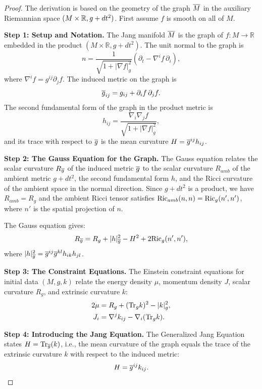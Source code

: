 \begin{proof}
The derivation is based on the geometry of the graph $\overline{M}$ in the auxiliary Riemannian space $(M \times \mathbb{R}, g+dt^2)$.
First assume $f$ is smooth on all of $M$.

\textbf{Step 1: Setup and Notation.}
The Jang manifold $\overline{M}$ is the graph of $f: M \to \mathbb{R}$ embedded in the product $(M \times \mathbb{R}, g + dt^2)$. The unit normal to the graph is
\[
    n = \frac{1}{\sqrt{1+|\nabla f|^2_g}} \left( \partial_t - \nabla^i f \, \partial_i \right),
\]
where $\nabla^i f = g^{ij} \partial_j f$. The induced metric on the graph is
\[
    \overline{g}_{ij} = g_{ij} + \partial_i f \, \partial_j f.
\]
The second fundamental form of the graph in the product metric is
\[
    h_{ij} = \frac{\nabla_i \nabla_j f}{\sqrt{1+|\nabla f|^2_g}},
\]
and its trace with respect to $\overline{g}$ is the mean curvature $H = \overline{g}^{ij} h_{ij}$.

\textbf{Step 2: The Gauss Equation for the Graph.}
The Gauss equation relates the scalar curvature $R_{\overline{g}}$ of the induced metric $\overline{g}$ to the scalar curvature $R_{amb}$ of the ambient metric $g + dt^2$, the second fundamental form $h$, and the Ricci curvature of the ambient space in the normal direction. Since $g + dt^2$ is a product, we have $R_{amb} = R_g$ and the ambient Ricci tensor satisfies $\mathrm{Ric}_{amb}(n,n) = \mathrm{Ric}_g(n',n')$, where $n'$ is the spatial projection of $n$.

The Gauss equation gives:
\begin{equation}\label{eq:GaussDetailed}
    R_{\overline{g}} = R_g + |h|_{\overline{g}}^2 - H^2 + 2\mathrm{Ric}_g(n', n'),
\end{equation}
where $|h|_{\overline{g}}^2 = \overline{g}^{ij}\overline{g}^{kl} h_{ik} h_{jl}$.

\textbf{Step 3: The Constraint Equations.}
The Einstein constraint equations for initial data $(M, g, k)$ relate the energy density $\mu$, momentum density $J$, scalar curvature $R_g$, and extrinsic curvature $k$:
\begin{align}
    2\mu &= R_g + (\mathrm{Tr}_g k)^2 - |k|_g^2, \label{eq:HamiltonianConstraint}\\
    J_i &= \nabla^j k_{ij} - \nabla_i (\mathrm{Tr}_g k). \label{eq:MomentumConstraint}
\end{align}

\textbf{Step 4: Introducing the Jang Equation.}
The Generalized Jang Equation states $H = \mathrm{Tr}_{\overline{g}}(k)$, i.e., the mean curvature of the graph equals the trace of the extrinsic curvature $k$ with respect to the induced metric:
\[
    H = \overline{g}^{ij} k_{ij}.
\]


\end{proof}
